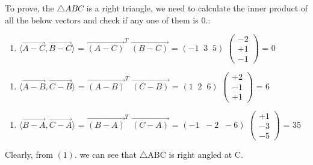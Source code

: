 \documentclass{article}
\begin{document}
To prove, the $\triangle ABC$ is a right triangle, we need to calculate the inner product of all the below vectors and check if any one of them is 0.:
\begin{enumerate}[1.]
	\item $\langle \overrightarrow{A-C}  ,\overrightarrow{B-C}\rangle$ = $\overrightarrow{(A-C)}^T$ $\overrightarrow{(B-C)}$ = $(-1\;\; 3 \;\; 5)$ $\begin{pmatrix} 
		-2\\+1\\-1 
	\end{pmatrix}$ = 0
\end{enumerate}
\begin{enumerate}[2.]
	\item $\langle \overrightarrow{A-B}  ,\overrightarrow{C-B}\rangle$ = $\overrightarrow{(A-B)}^T$ $\overrightarrow{(C-B)}$ = $(1\;\; 2 \;\; 6)$ $\begin{pmatrix} 
		+2\\-1\\+1 
	\end{pmatrix}$ = 6
\end{enumerate}

\begin{enumerate}[3.]
	\item $\langle \overrightarrow{B-A}  ,\overrightarrow{C-A}\rangle$ = $\overrightarrow{(B-A)}^T$ $\overrightarrow{(C-A)}$ = $(-1\;\; -2 \;\; -6)$ $\begin{pmatrix} 
		+1\\-3\\-5 
	\end{pmatrix}$ = 35
\end{enumerate}
Clearly, from $(1).$ we can see that $\triangle$ABC is right angled at C.
\end{document}
